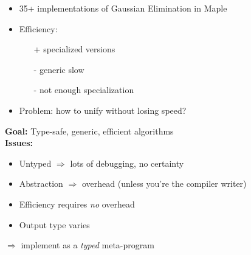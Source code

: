 \documentclass[landscape]{slides}
\begin{document}
\begin{slide}
    \begin{itemize}
        \item 35+ implementations of Gaussian Elimination in Maple
        \item Efficiency:
            \begin{itemize}
                \item[+] specialized versions 
                \item[-] generic slow
                \item[-] not enough specialization
            \end{itemize}
        \item Problem: how to unify without losing speed?
    \end{itemize}
\end{slide}

\begin{slide}
    \textbf{Goal:} Type-safe, generic, efficient algorithms\\
    \textbf{Issues:}
    \begin{itemize}
        \item Untyped $\Rightarrow$ lots of debugging, no certainty\vsii
        \item Abstraction $\Rightarrow$ overhead 
            (unless you're the compiler writer)\vsii
        \item Efficiency requires \emph{no} overhead\vsii
        \item Output type varies\vsi
    \end{itemize}
    $\Longrightarrow$ implement as a \emph{typed} meta-program
\end{slide}
\end{document}
